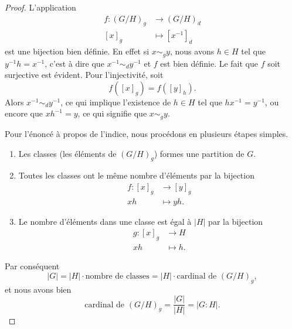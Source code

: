 \begin{proof}
    L'application
    \begin{equation}
        \begin{aligned}
            f\colon (G/H)_g&\to (G/H)_d \\
            [x]_g&\mapsto [x^{-1}]_d 
        \end{aligned}
    \end{equation}
    est une bijection bien définie. En effet si \( x\sim_g y\), nous avons \( h\in H\) tel que \( y^{-1}h=x^{-1}\), c'est à dire que \( x^{-1}\sim_d y^{-1}\) et \( f\) est bien définie. Le fait que \( f\) soit surjective est évident. Pour l'injectivité, soit
    \begin{equation}
        f([x]_g)=f([y]_h).
    \end{equation}
    Alors \( x^{-1}\sim_d y^{-1}\), ce qui implique l'existence de \( h\in H\) tel que \( hx^{-1}=y^{-1}\), ou encore que \( xh^{-1}=y\), ce qui signifie que \( x\sim_gy\).

    Pour l'énoncé à propos de l'indice, nous procédons en plusieurs étapes simples.
    \begin{enumerate}
        \item
            Les classes (les éléments de \( (G/H)_g\)) formes une partition de $G$.
        \item
            Toutes les classes ont le même nombre d'éléments par la bijection 
            \begin{equation}
                \begin{aligned}
                    f\colon [x]_g&\to [y]_g \\
                    xh&\mapsto yh. 
                \end{aligned}
            \end{equation}
        \item
            Le nombre d'éléments dans une classe est égal à \( | H |\) par la bijection
            \begin{equation}
                \begin{aligned}
                    g\colon [x]_g&\to H \\
                    xh&\mapsto h. 
                \end{aligned}
            \end{equation}
    \end{enumerate}
    Par conséquent
    \begin{equation}
        | G |=| H |\cdot \text{nombre de classes}=| H |\cdot\text{cardinal de $(G/H)_g$},
    \end{equation}
    et nous avons bien 
    \begin{equation}
        \text{cardinal de $(G/H)_g$}=\frac{ | G | }{ | H | }=| G:H |.
    \end{equation}
\end{proof}

